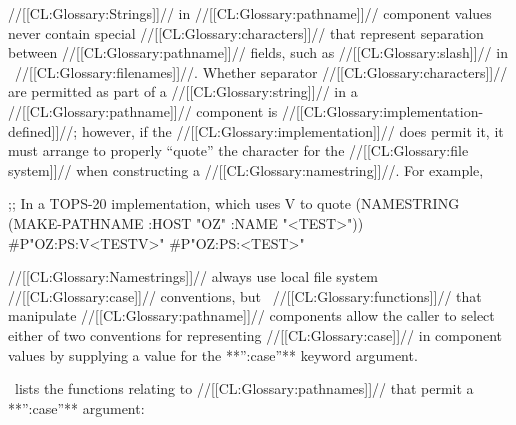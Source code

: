 \endsubsubsection%

\endSubsection%





//[[CL:Glossary:Strings]]// in //[[CL:Glossary:pathname]]// component values  never contain special //[[CL:Glossary:characters]]// that represent separation between //[[CL:Glossary:pathname]]// fields,  such as //[[CL:Glossary:slash]]// in \Unix\ //[[CL:Glossary:filenames]]//. Whether separator //[[CL:Glossary:characters]]// are permitted as  part of a //[[CL:Glossary:string]]// in a //[[CL:Glossary:pathname]]// component is //[[CL:Glossary:implementation-defined]]//;  however, if the //[[CL:Glossary:implementation]]// does permit it,  it must arrange to properly ``quote'' the character for the  //[[CL:Glossary:file system]]// when constructing a //[[CL:Glossary:namestring]]//. For example,

\code
 ;; In a TOPS-20 implementation, which uses {\hat}V to quote 
 (NAMESTRING (MAKE-PATHNAME :HOST "OZ" :NAME "<TEST>")) \EV #P"OZ:PS:{\hat}V<TEST{\hat}V>" \NV #P"OZ:PS:<TEST>" \endcode

  \endsubsubsubsection%

  

//[[CL:Glossary:Namestrings]]// always use local file system //[[CL:Glossary:case]]// conventions,  but \clisp\ //[[CL:Glossary:functions]]// that manipulate //[[CL:Glossary:pathname]]// components allow the caller to select either of two conventions for representing //[[CL:Glossary:case]]// in component values by supplying a value for the **'':case''** keyword argument.

\Thenextfigure\ lists the functions  relating to //[[CL:Glossary:pathnames]]// that permit a **'':case''** argument:

 

